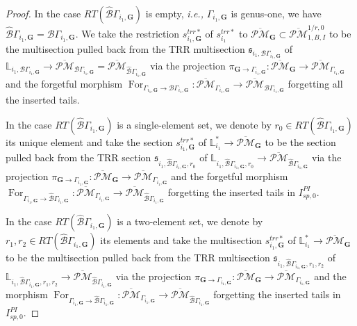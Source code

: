 \documentclass[11pt]{amsart}
\theoremstyle{definition}
\theoremstyle{remark}
\newcommand{\oPMb}{{\overline{\mathcal{PM}}}}
\newcommand{\nontilde}{}
\newcommand{\<}{\left<}
\renewcommand{\>}{\right>}
\numberwithin{equation}{section}
\begin{document}
\begin{proof}
        In the case $RT(\hat{\mathcal B}\Gamma_{i_1,\bm{G}})$ is empty, \textit{i.e.,} $\Gamma_{i_1,\bm{G}}$ is genus-one, we have $\hat{\mathcal B}\Gamma_{i_1,\bm{G}}={\mathcal B}\Gamma_{i_1,\bm{G}}$. We take the restriction $\nontilde{s}^{trr*}_{i_1,\bm{G}}$ of $\nontilde{s}^{trr*}_{i_1}$ to $\oPMb_{\bm{G}}\subset \oPMb^{1/r,0}_{1,B,I}$ to be the multisection pulled back from the TRR multisection 
        $\mathfrak s_{i_1,\mathcal B\Gamma_{i_1,\bm{G}}}$ of $\mathbb L_{i_1,\mathcal B\Gamma_{i_1,\bm{G}}}\to \oPMb_{\mathcal B\Gamma_{i_1,\bm{G}}}=\oPMb_{\hat{\mathcal B}\Gamma_{i_1,\bm{G}}}$ via the projection $\pi_{\mathbf{G}\to \Gamma_{i_1,\mathbf{G}}}\colon \oPMb_{\mathbf{G}}\to \oPMb_{\Gamma_{i_1,\mathbf{G}}}$ and the forgetful morphism $\operatorname{For}_{\Gamma_{i_1,\bm{G}}\to \mathcal B \Gamma_{i_1,\bm{G}}}\colon \oPMb_{\Gamma_{i_1,\bm{G}}}\to \oPMb_{\mathcal B \Gamma_{i_1,\bm{G}}}$ forgetting all the inserted tails. 
        
        In the case $RT(\hat{\mathcal B}\Gamma_{i_1,\bm{G}})$ is a single-element set, we denote by $r_0\in RT(\hat{\mathcal B}\Gamma_{i_1,\bm{G}})$ its unique element and take the section $\nontilde{s}^{trr*}_{i_1,\mathbf{G}}$ of ${\mathbb L}^*_{i_1}\to \oPMb_{\bm{G}}$ to be the section pulled back from the TRR section $\mathfrak s_{i_1,\hat{\mathcal B}\Gamma_{i_1,\bm{G}},r_0}$ of $\mathbb L_{i_1,\hat{\mathcal B}\Gamma_{i_1,\bm{G}},r_0}\to \oPMb_{\hat{\mathcal B}\Gamma_{i_1,\bm{G}}}$ via the projection $\pi_{\mathbf{G}\to \Gamma_{i_1,\mathbf{G}}}\colon \oPMb_{\mathbf{G}}\to \oPMb_{\Gamma_{i_1,\mathbf{G}}}$ and the forgetful morphism $\operatorname{For}_{\Gamma_{i_1,\bm{G}}\to \hat{\mathcal B} \Gamma_{i_1,\bm{G}}}\colon \oPMb_{\Gamma_{i_1,\bm{G}}}\to \oPMb_{\hat{\mathcal B} \Gamma_{i_1,\bm{G}}}$ forgetting the inserted tails in $I^{PI}_{sp,0}$.  
        
        In the case $RT(\hat{\mathcal B}\Gamma_{i_1,\bm{G}})$ is a two-element set, we denote by $r_1,r_2\in RT(\hat{\mathcal B}\Gamma_{i_1,\bm{G}})$ its elements and take the multisection $\nontilde{s}^{trr*}_{i_1,\mathbf{G}}$ of ${\mathbb L}^*_{i_1}\to \oPMb_{\bm{G}}$ to be the multisection pulled back from the TRR multisection $\mathfrak s_{i_1,\hat{\mathcal B}\Gamma_{i_1,\bm{G}},r_1,r_2}$ of $\mathbb L_{i_1,\hat{\mathcal B}\Gamma_{i_1,\bm{G}},r_1,r_2}\to \oPMb_{\hat{\mathcal B}\Gamma_{i_1,\bm{G}}}$ via the projection $\pi_{\mathbf{G}\to \Gamma_{i_1,\mathbf{G}}}\colon \oPMb_{\mathbf{G}}\to \oPMb_{\Gamma_{i_1,\mathbf{G}}}$ and the morphism $\operatorname{For}_{\Gamma_{i_1,\bm{G}}\to \hat{\mathcal B} \Gamma_{i_1,\bm{G}}}\colon \oPMb_{\Gamma_{i_1,\bm{G}}}\to \oPMb_{\hat{\mathcal B} \Gamma_{i_1,\bm{G}}}$ forgetting the inserted tails in $I^{PI}_{sp,0}$.


\end{proof}
\end{document}

